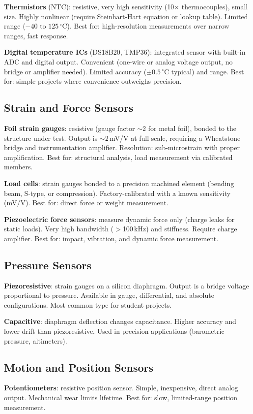 \documentclass[11pt,letterpaper,twoside,openany]{book}
\newcommand{\degC}{\ensuremath{{}^{\circ}\text{C}}}
\begin{document}
\textbf{Thermistors} (NTC): resistive, very high sensitivity (10$\times$ thermocouples), small size. Highly nonlinear (require Steinhart-Hart equation or lookup table). Limited range ($-40$ to $125$\,\degC{}). Best for: high-resolution measurements over narrow ranges, fast response.

\textbf{Digital temperature ICs} (DS18B20, TMP36): integrated sensor with built-in ADC and digital output. Convenient (one-wire or analog voltage output, no bridge or amplifier needed). Limited accuracy ($\pm 0.5$\,\degC{} typical) and range. Best for: simple projects where convenience outweighs precision.

\subsection{Strain and Force Sensors}
\textbf{Foil strain gauges}: resistive (gauge factor $\sim$2 for metal foil), bonded to the structure under test. Output is $\sim$2\,mV/V at full scale, requiring a Wheatstone bridge and instrumentation amplifier. Resolution: sub-microstrain with proper amplification. Best for: structural analysis, load measurement via calibrated members.

\textbf{Load cells}: strain gauges bonded to a precision machined element (bending beam, S-type, or compression). Factory-calibrated with a known sensitivity (mV/V). Best for: direct force or weight measurement.

\textbf{Piezoelectric force sensors}: measure dynamic force only (charge leaks for static loads). Very high bandwidth ($>$100\,kHz) and stiffness. Require charge amplifier. Best for: impact, vibration, and dynamic force measurement.

\subsection{Pressure Sensors}
\textbf{Piezoresistive}: strain gauges on a silicon diaphragm. Output is a bridge voltage proportional to pressure. Available in gauge, differential, and absolute configurations. Most common type for student projects.

\textbf{Capacitive}: diaphragm deflection changes capacitance. Higher accuracy and lower drift than piezoresistive. Used in precision applications (barometric pressure, altimeters).

\subsection{Motion and Position Sensors}
\textbf{Potentiometers}: resistive position sensor. Simple, inexpensive, direct analog output. Mechanical wear limits lifetime. Best for: slow, limited-range position measurement.
\end{document}
